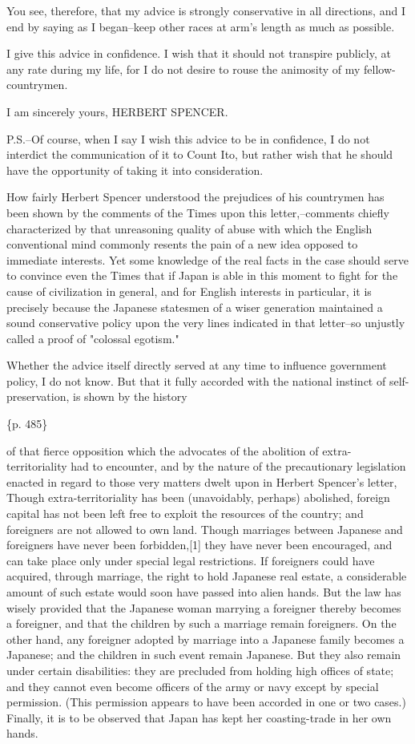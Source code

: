 You see, therefore, that my advice is strongly conservative in all directions, and I end by saying as I began--keep other races at arm's length as much as possible.

I give this advice in confidence. I wish that it should not transpire publicly, at any rate during my life, for I do not desire to rouse the animosity of my fellow-countrymen.

I am sincerely yours,                HERBERT SPENCER.

P.S.--Of course, when I say I wish this advice to be in confidence, I do not interdict the communication of it to Count Ito, but rather wish that he should have the opportunity of taking it into consideration.



How fairly Herbert Spencer understood the prejudices of his countrymen has been shown by the comments of the Times upon this letter,--comments chiefly characterized by that unreasoning quality of abuse with which the English conventional mind commonly resents the pain of a new idea opposed to immediate interests. Yet some knowledge of the real facts in the case should serve to convince even the Times that if Japan is able in this moment to fight for the cause of civilization in general, and for English interests in particular, it is precisely because the Japanese statesmen of a wiser generation maintained a sound conservative policy upon the very lines indicated in that letter--so unjustly called a proof of "colossal egotism."

Whether the advice itself directly served at any time to influence government policy, I do not know. But that it fully accorded with the national instinct of self-preservation, is shown by the history

\{p. 485\}

of that fierce opposition which the advocates of the abolition of extra-territoriality had to encounter, and by the nature of the precautionary legislation enacted in regard to those very matters dwelt upon in Herbert Spencer's letter, Though extra-territoriality has been (unavoidably, perhaps) abolished, foreign capital has not been left free to exploit the resources of the country; and foreigners are not allowed to own land. Though marriages between Japanese and foreigners have never been forbidden,[1] they have never been encouraged, and can take place only under special legal restrictions. If foreigners could have acquired, through marriage, the right to hold Japanese real estate, a considerable amount of such estate would soon have passed into alien hands. But the law has wisely provided that the Japanese woman marrying a foreigner thereby becomes a foreigner, and that the children by such a marriage remain foreigners. On the other hand, any foreigner adopted by marriage into a Japanese family becomes a Japanese; and the children in such event remain Japanese. But they also remain under certain disabilities: they are precluded from holding high offices of state; and they cannot even become officers of the army or navy except by special permission. (This permission appears to have been accorded in one or two cases.) Finally, it is to be observed that Japan has kept her coasting-trade in her own hands.

